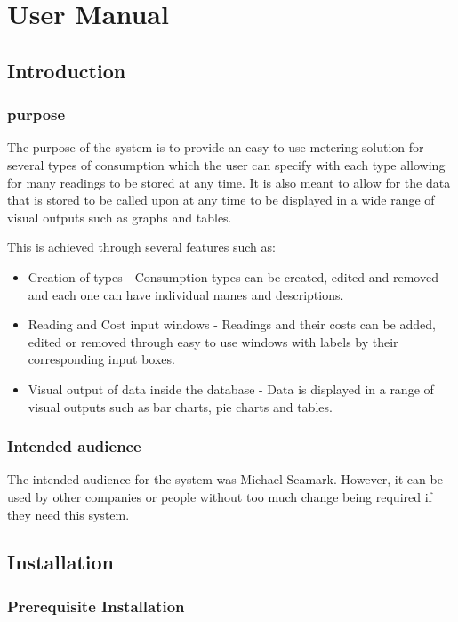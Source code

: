 \chapter{User Manual}

\startcontents[chapters]

\section{Introduction}
\subsection{purpose}
The purpose of the system is to provide an easy to use metering solution for several types of consumption which the user can specify with each type allowing for many readings to be stored at any time. It is also meant to allow for the data that is stored to be called upon at any time to be displayed in a wide range of visual outputs such as graphs and tables.

This is achieved through several features such as:
\begin{itemize}
	\item Creation of types - Consumption types can be created, edited and removed and each one can have individual names and descriptions.
	\item Reading and Cost input windows - Readings and their costs can be added, edited or removed through easy to use windows with labels by their corresponding input boxes.
	\item Visual output of data inside the database - Data is displayed in a range of visual outputs such as bar charts, pie charts and tables.
\end{itemize}

\subsection{Intended audience}
The intended audience for the system was Michael Seamark. However, it can be used by other companies or people without too much change being required if they need this system.

\section{Installation}

\subsection{Prerequisite Installation}
\label{Prerequisite_Installation}

